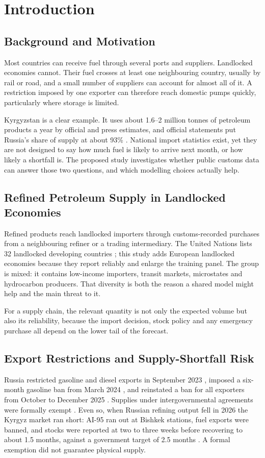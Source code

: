 \documentclass[conference]{IEEEtran}
\begin{document}
\section{Introduction}

\subsection{Background and Motivation}
Most countries can receive fuel through several ports and suppliers. Landlocked economies cannot. Their fuel crosses at least one neighbouring country, usually by rail or road, and a small number of suppliers can account for almost all of it. A restriction imposed by one exporter can therefore reach domestic pumps quickly, particularly where storage is limited.

Kyrgyzstan is a clear example. It uses about 1.6--2 million tonnes of petroleum products a year by official and press estimates, and official statements put Russia's share of supply at about 93\% \cite{economist_stocks,kg24_exempt}. National import statistics exist, yet they are not designed to say how much fuel is likely to arrive next month, or how likely a shortfall is. The proposed study investigates whether public customs data can answer those two questions, and which modelling choices actually help.

\subsection{Refined Petroleum Supply in Landlocked Economies}
Refined products reach landlocked importers through customs-recorded purchases from a neighbouring refiner or a trading intermediary. The United Nations lists 32 landlocked developing countries \cite{ohrlls}; this study adds European landlocked economies because they report reliably and enlarge the training panel. The group is mixed: it contains low-income importers, transit markets, microstates and hydrocarbon producers. That diversity is both the reason a shared model might help and the main threat to it.

For a supply chain, the relevant quantity is not only the expected volume but also its reliability, because the import decision, stock policy and any emergency purchase all depend on the lower tail of the forecast.

\subsection{Export Restrictions and Supply-Shortfall Risk}
Russia restricted gasoline and diesel exports in September 2023 \cite{gta2023}, imposed a six-month gasoline ban from March 2024 \cite{enerdata2024}, and reinstated a ban for all exporters from October to December 2025 \cite{gta2025}. Supplies under intergovernmental agreements were formally exempt \cite{kg24_exempt}. Even so, when Russian refining output fell in 2026 the Kyrgyz market ran short: AI-95 ran out at Bishkek stations, fuel exports were banned, and stocks were reported at two to three weeks before recovering to about 1.5 months, against a government target of 2.5 months \cite{kwan2026,kunuz2026,economist_stocks}. A formal exemption did not guarantee physical supply.
\end{document}
